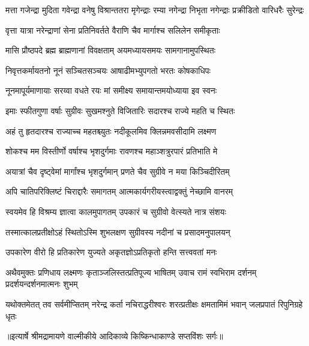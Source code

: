 \fourlineindentedshloka
{मत्ता गजेन्द्रा मुदिता गवेन्द्रा}
{वनेषु विश्रान्ततरा मृगेन्द्राः}
{रम्या नगेन्द्रा निभृता नगेन्द्राः}
{प्रक्रीडितो वारिधरैः सुरेन्द्रः} %

\twolineshloka
{वृत्ता यात्रा नरेन्द्राणां सेना प्रतिनिवर्तते}
{वैराणि चैव मार्गाश्च सलिलेन समीकृताः} %

\twolineshloka
{मासि प्रौष्ठपदे ब्रह्म ब्राह्मणानां विवक्षताम्}
{अयमध्यायसमयः सामगानामुपस्थितः} %

\twolineshloka
{निवृत्तकर्मायतनो नूनं सञ्चितसञ्चयः}
{आषाढीमभ्युपगतो भरतः कोषकाधिपः} %

\twolineshloka
{नूनमापूर्यमाणायाः सरय्वा वधते रयः}
{मां समीक्ष्य समायान्तमयोध्याया इव स्वनः} %

\twolineshloka
{इमाः स्फीतगुणा वर्षाः सुग्रीवः सुखमश्नुते}
{विजितारिः सदारश्च राज्ये महति च स्थितः} %

\twolineshloka
{अहं तु हृतदारश्च राज्याच्च महतश्च्युतः}
{नदीकूलमिव क्लिन्नमवसीदामि लक्ष्मण} %

\twolineshloka
{शोकश्च मम विस्तीर्णो वर्षाश्च भृशदुर्गमाः}
{रावणश्च महाञ्शत्रुरपारं प्रतिभाति मे} %

\twolineshloka
{अयात्रां चैव दृष्ट्वेमां मार्गांश्च भृशदुर्गमान्}
{प्रणते चैव सुग्रीवे न मया किञ्चिदीरितम्} %

\twolineshloka
{अपि चातिपरिक्लिष्टं चिराद्दारैः समागतम्}
{आत्मकार्यगरीयस्त्वाद्वक्तुं नेच्छामि वानरम्} %

\twolineshloka
{स्वयमेव हि विश्रम्य ज्ञात्वा कालमुपागतम्}
{उपकारं च सुग्रीवो वेत्स्यते नात्र संशयः} %

\twolineshloka
{तस्मात्कालप्रतीक्षोऽहं स्थितोऽस्मि शुभलक्षण}
{सुग्रीवस्य नदीनां च प्रसादमनुपालयन्} %

\twolineshloka
{उपकारेण वीरो हि प्रतिकारेण युज्यते}
{अकृतज्ञोऽप्रतिकृतो हन्ति सत्त्ववतां मनः} %

\fourlineindentedshloka
{अथैवमुक्तः प्रणिधाय लक्ष्मणः}
{कृताञ्जलिस्तत्प्रतिपूज्य भाषितम्}
{उवाच रामं स्वभिराम दर्शनम्}
{प्रदर्शयन्दर्शनमात्मनः शुभम्} %

\fourlineindentedshloka
{यथोक्तमेतत् तव सर्वमीप्सितम्}
{नरेन्द्र कर्ता नचिराद्धरीश्वरः}
{शरत्प्रतीक्षः क्षमतामिमं भवान्}
{जलप्रपातं रिपुनिग्रहे धृतः} %


{॥इत्यार्षे श्रीमद्रामायणे वाल्मीकीये आदिकाव्ये किष्किन्धाकाण्डे सप्तविंशः सर्गः॥}


